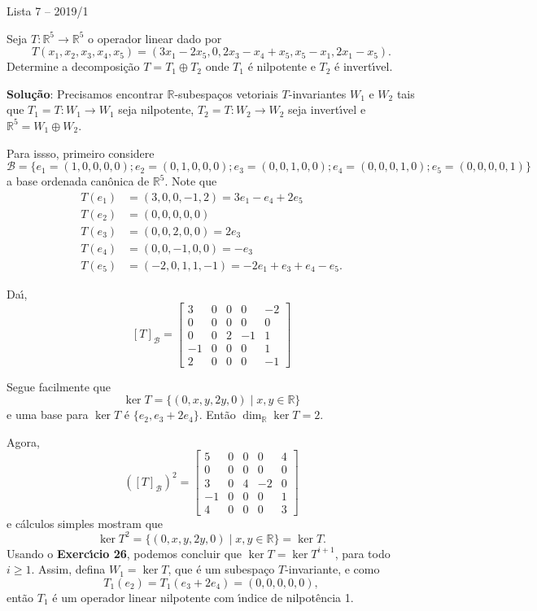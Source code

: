 \documentclass[12pt]{article}
\newcounter{exercicios}
\newcommand{\questao}{
\addtocounter{exercicios}{27}
\noindent{\bf Exerc{\'\i}cio \arabic{exercicios}: }}
\newcommand{\real}{\mathbb{R}}
\begin{document}
\begin{center}
    Lista 7 -- 2019/1
\end{center}
\questao Seja $T : \real^5 \to \real^5$ o operador linear dado por
  \[
      T(x_1,x_2,x_3,x_4,x_5) = (3x_1 -2x_5, 0 , 2x_3 - x_4 + x_5, x_5 - x_1, 2x_1 - x_5).
  \]
  Determine a decomposi\c{c}\~ao $T = T_1 \oplus T_2$ onde $T_1$ \'e nilpotente e $T_2$ \'e invert{\'\i}vel.

\textbf{Solu{\c c}{\~a}o}: Precisamos encontrar $\real$-subespa\c{c}os vetoriais $T$-invariantes $W_1$ e $W_2$ tais que $T_1 = T : W_1 \to W_1$ seja nilpotente, $T_2 = T : W_2 \to W_2$ seja invert{\'\i}vel e $\real^5 = W_1 \oplus W_2$.

Para issso, primeiro considere
\[
    \mathcal{B} = \{e_1 = (1,0,0,0,0); e_2 = (0,1,0,0,0); e_3 = (0,0,1,0,0); e_4 = (0,0,0,1,0); e_5 = (0,0,0,0,1)\}
\]
a base ordenada can\^onica de $\real^5$. Note que
\begin{align*}
    T(e_1) &= (3,0,0,-1,2) = 3e_1 - e_4 + 2e_5\\
    T(e_2) &= (0,0,0,0,0)\\
    T(e_3) &= (0,0,2,0,0) = 2e_3\\
    T(e_4) &= (0,0,-1,0,0) = -e_3\\
    T(e_5) &= (-2,0,1,1,-1) = -2e_1 + e_3 + e_4 - e_5.
\end{align*}

Da{\'\i},
\[
    [T]_\mathcal{B} = \begin{bmatrix}
        3 & 0 & 0 & 0 & -2\\
        0 & 0 & 0 & 0 & 0\\
        0 & 0 & 2 & -1 & 1\\
        -1 & 0 & 0 & 0 & 1\\
        2 & 0 & 0 & 0 & -1
    \end{bmatrix}
\]

Segue facilmente que
\[
    \ker T = \{(0,x,y,2y,0)\mid x, y \in \real\}
\]
e uma base para $\ker T$ \'e $\{e_2, e_3 + 2e_4\}$. Ent\~ao $\dim_\real\ker T = 2$.

Agora,
\[
    ([T]_\mathcal{B})^2 = \begin{bmatrix}
        5 & 0 & 0 & 0 & 4\\
        0 & 0 & 0 & 0 & 0\\
        3 & 0 & 4 & -2 & 0\\
        -1 & 0 & 0 & 0 & 1\\
        4 & 0 & 0 & 0 & 3
    \end{bmatrix}
\]
e c\'alculos simples mostram que
\[
    \ker T^2 = \{(0,x,y,2y,0)\mid x, y \in \real\} = \ker T.
\]
Usando o \textbf{Exerc{\'\i}cio 26}, podemos concluir que $\ker T = \ker T^{i + 1}$, para todo $i \ge 1$.
Assim, defina $W_1 = \ker T$, que \'e um subespa\c{c}o $T$-invariante, e como
\[
    T_1(e_2) = T_1(e_3 + 2e_4) = (0,0,0,0,0),
\]
ent\~ao $T_1$ \'e um operador linear nilpotente com {\'\i}ndice de nilpot\^encia 1.
\end{document}
